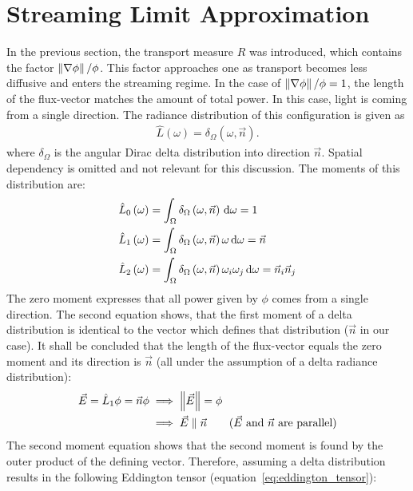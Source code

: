 \section{Streaming Limit Approximation}
\label{sec:fld_streaming_limit_approximation}

In the previous section, the transport measure $R$ was introduced, which contains the factor $\left\lVert\nabla\phi\right\rVert/\phi$. This factor approaches one as transport becomes less diffusive and enters the streaming regime. In the case of $\left\lVert\nabla\phi\right\rVert/\phi=1$, the length of the flux-vector matches the amount of total power. In this case, light is coming from a single direction. The radiance distribution of this configuration is given as
\begin{align}
\hat{L}\left(\omega\right)=\delta_{\Omega}\left(\omega,\vec{n}\right).
\end{align}
where $\delta_{\Omega}$ is the angular Dirac delta distribution into direction $\vec{n}$. Spatial dependency is omitted and not relevant for this discussion. The moments of this distribution are:
\begin{align}
\label{eq:zero_moment_Lhat}
\hat{L}_0\left(\omega\right)&=\int_{\Omega}{\delta_{\Omega}\left(\omega,\vec{n}\right)\,\mathrm{d}\omega} = 1\\
\label{eq:first_moment_Lhat}
\hat{L}_1\left(\omega\right)&=\int_{\Omega}{\delta_{\Omega}\left(\omega,\vec{n}\right)\omega\,\mathrm{d}\omega} = \vec{n}\\
\label{eq:second_moment_Lhat}
\hat{L}_2\left(\omega\right)&=\int_{\Omega}{\delta_{\Omega}\left(\omega,\vec{n}\right)\omega_i\omega_j\,\mathrm{d}\omega} = \vec{n}_i\vec{n}_j
\end{align}
The zero moment expresses that all power given by $\phi$ comes from a single direction. The second equation shows, that the first moment of a delta distribution is identical to the vector which defines that distribution ($\vec{n}$ in our case). It shall be concluded that the length of the flux-vector equals the zero moment and its direction is $\vec{n}$ (all under the assumption of a delta radiance distribution):
\begin{align}
\label{eq:iso_delta_normE}
\vec{E} = \hat{L}_1\phi = \vec{n}\phi  &\implies \left\lVert\vec{E}\right\rVert = \phi\\
&\implies \vec{E} \parallel \vec{n} \qquad \text{($\vec{E}$ and $\vec{n}$ are parallel)}
\end{align}
The second moment equation shows that the second moment is found by the outer product of the defining vector. Therefore, assuming a delta distribution results in the following Eddington tensor (equation~\ref{eq:eddington_tensor}):

